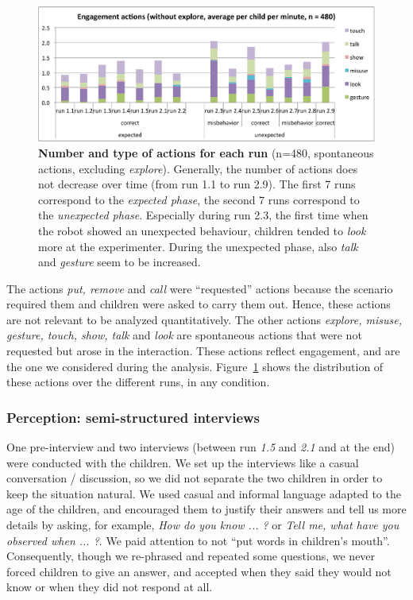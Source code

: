 \documentclass{sig-alternate}
\begin{document}
\begin{figure}[ht!] 
    \centering 
    \includegraphics[width=0.9\linewidth]{domino-time-active.pdf} 
    \caption{\small \textbf{Number and type of actions for each run} (n=480,
        spontaneous actions, excluding \emph{explore}). Generally, the number of
        actions does not decrease over time (from run 1.1 to run 2.9).  The
        first 7 runs correspond to the \textit{expected phase}, the second 7
        runs correspond to the \textit{unexpected phase}. Especially during run
        2.3, the first time when the robot showed an unexpected behaviour,
        children tended to \textit{look} more at the experimenter. During the
        unexpected phase, also \textit{talk} and \textit{gesture} seem to be
        increased.}

    \label{fig:domino-time-active} 
\end{figure}

The actions \textit{put, remove} and \textit{call} were ``requested'' actions
because the scenario required them and children were asked to carry them out.
Hence, these actions are not relevant to be analyzed quantitatively. The other
actions \textit{explore, misuse, gesture, touch, show, talk} and \textit{look}
are spontaneous actions that were not requested but arose in the interaction.
These actions reflect engagement, and are the one we considered during the
analysis. Figure~\ref{fig:domino-time-active} shows the distribution of these
actions over the different runs, in any condition.

\subsubsection{Perception: semi-structured interviews}

One pre-interview and two interviews (between run \emph{1.5} and \emph{2.1} and
at the end) were conducted with the children.  We set up the interviews like a
casual conversation / discussion, so we did not separate the two children in
order to keep the situation natural. We used casual and informal language
adapted to the age of the children, and encouraged them to justify their answers
and tell us more details by asking, for example, \textit{How do you know ... ?}
or \textit{Tell me, what have you observed when ... ?}. We paid attention to not
``put words in children's mouth''. Consequently, though we re-phrased and
repeated some questions, we never forced children to give an answer, and
accepted when they said they would not know or when they did not respond at all.	
\end{document}

